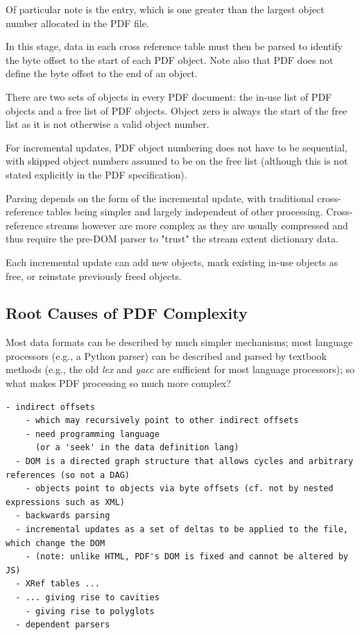 Of particular note is the  entry, which
is one greater than the largest object number allocated in the PDF
file.

In this stage, data in each cross reference table must then be parsed to
identify the byte offset to the start of each PDF object. Note also that PDF
does not define the byte offset to the end of an object.

There are two sets of
objects in every PDF document: the in-use list of PDF objects and a free list
of PDF objects. Object zero is always the start of the free list as it is not
otherwise a valid object number.

For incremental updates, PDF object numbering
does not have to be sequential, with skipped object numbers assumed to be on
the free list (although this is not stated explicitly in the PDF
specification).

Parsing depends on the form of the incremental update, with
traditional cross-reference tables being simpler and largely independent of
other processing. Cross-reference streams however are more complex as they are
usually compressed and thus require the pre-DOM parser to "trust" the stream
extent dictionary data.

Each incremental update can add new objects, mark existing in-use objects as
free, or reinstate previously freed objects.



\subsection{Root Causes of PDF Complexity}

Most data formats can be described by much simpler mechanisms;
most language processors (e.g., a Python parser) can be described and parsed by
textbook methods (e.g., the old \emph{lex} and \emph{yacc} are sufficient for
most language processors);
so what makes PDF processing so much more complex?
\begin{lstlisting}[style=meta]
  - indirect offsets
    - which may recursively point to other indirect offsets
    - need programming language
      (or a 'seek' in the data definition lang)
  - DOM is a directed graph structure that allows cycles and arbitrary references (so not a DAG)
    - objects point to objects via byte offsets (cf. not by nested expressions such as XML)  
  - backwards parsing
  - incremental updates as a set of deltas to be applied to the file, which change the DOM
    - (note: unlike HTML, PDF's DOM is fixed and cannot be altered by JS)
  - XRef tables ...
  - ... giving rise to cavities
    - giving rise to polyglots
  - dependent parsers
\end{lstlisting}

